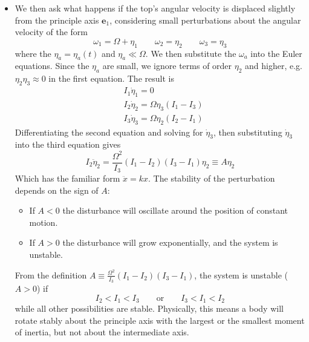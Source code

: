 \documentclass[11pt, a4paper]{article}
\newcommand{\eqtext}[1]{\qquad \text{#1} \qquad}
\newcommand{\e}{\mathbf{e}} %
\begin{document}
\begin{itemize}
	\item We then ask what happens if the top's angular velocity is displaced slightly from the principle axis $ \e_{1} $, considering small perturbations about the angular velocity of the form
	\begin{equation*}
		\omega_{1} = \Omega + \eta_{1} \qquad \omega_{2} = \eta_{2} \qquad \omega_{3} = \eta_{3}
	\end{equation*}
	where the $ \eta_{a} = \eta_{a}(t) $ and $ \eta_{a} \ll \Omega $. We then substitute the $ \omega_{a} $ into the Euler equations. Since the $ \eta_{a} $ are small, we ignore terms of order $ \eta_{2} $ and higher, e.g. $ \eta_{2}\eta_{3} \approx 0 $ in the first equation. The result is
	\begin{align*}
		&I_{1}\dot{\eta}_{1} = 0\\
		&I_{2}\dot{\eta}_{2} = \Omega \eta_{3}(I_{1} - I_{3})\\
		&I_{3}\dot{\eta}_{3} = \Omega \eta_{2}(I_{2} - I_{1})
	\end{align*}
	Differentiating the second equation and solving for $ \dot{\eta}_{3} $, then substituting $ \dot{\eta}_{3} $ into the third equation gives
	\begin{equation*}
		I_{2} \ddot{\eta}_{2} = \frac{\Omega^{2}}{I_{3}} (I_{1} - I_{2})(I_{3} - I_{1}) \eta_{2} \equiv A \eta_{2}
	\end{equation*}
	Which has the familiar form $ \ddot{x} = k x $. The stability of the perturbation depends on the sign of $ A $:
	\begin{itemize}
		\item If $ A < 0 $ the disturbance will oscillate around the position of constant motion.
		\item If $ A > 0 $ the disturbance will grow exponentially, and the system is unstable.
	\end{itemize}
	From the definition $ A \equiv \frac{\Omega^{2}}{I_{3}} (I_{1} - I_{2})(I_{3} - I_{1})  $, the system is unstable ($ A > 0 $) if 
	\begin{equation*}
		I_{2} < I_{1} < I_{3} \eqtext{or} I_{3} < I_{1} < I_{2}
	\end{equation*}
	while all other possibilities are stable. Physically, this means a body will rotate stably about the principle axis with the largest or the smallest moment of inertia, but not about the intermediate axis.
	
	
	
\end{itemize}
\end{document}
